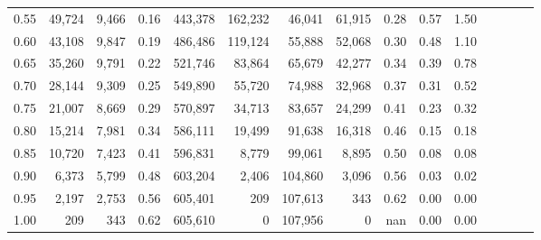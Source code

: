 \begin{tabular}{rrrcrrrrrrrrrrr}
0.55 &  49,724 &  9,466 &                                       0.16 &  443,378 &  162,232 &   46,041 &   61,915 &  0.28 &  0.57 &                         1.50 \\
0.60 &  43,108 &  9,847 &                                       0.19 &  486,486 &  119,124 &   55,888 &   52,068 &  0.30 &  0.48 &                         1.10 \\
0.65 &  35,260 &  9,791 &                                       0.22 &  521,746 &   83,864 &   65,679 &   42,277 &  0.34 &  0.39 &                         0.78 \\
0.70 &  28,144 &  9,309 &                                       0.25 &  549,890 &   55,720 &   74,988 &   32,968 &  0.37 &  0.31 &                         0.52 \\
0.75 &  21,007 &  8,669 &                                       0.29 &  570,897 &   34,713 &   83,657 &   24,299 &  0.41 &  0.23 &                         0.32 \\
0.80 &  15,214 &  7,981 &                                       0.34 &  586,111 &   19,499 &   91,638 &   16,318 &  0.46 &  0.15 &                         0.18 \\
0.85 &  10,720 &  7,423 &                                       0.41 &  596,831 &    8,779 &   99,061 &    8,895 &  0.50 &  0.08 &                         0.08 \\
0.90 &   6,373 &  5,799 &                                       0.48 &  603,204 &    2,406 &  104,860 &    3,096 &  0.56 &  0.03 &                         0.02 \\
0.95 &   2,197 &  2,753 &                                       0.56 &  605,401 &      209 &  107,613 &      343 &  0.62 &  0.00 &                         0.00 \\
1.00 &     209 &    343 &                                       0.62 &  605,610 &        0 &  107,956 &        0 &   nan &  0.00 &                         0.00 \\
\bottomrule
\end{tabular}
